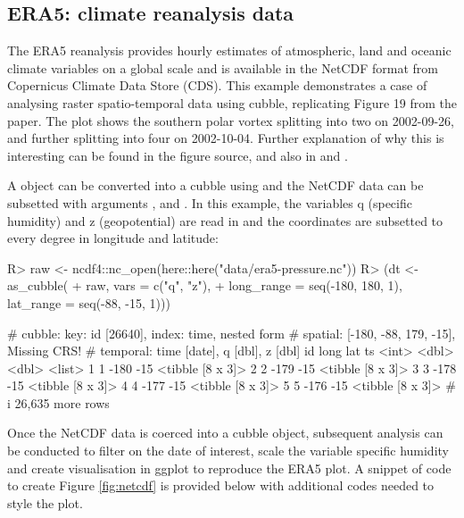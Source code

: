 \documentclass[
  shortnames]{jss}
\begin{document}
\hypertarget{era5-climate-reanalysis-data}{%
\subsection{ERA5: climate reanalysis data}\label{era5-climate-reanalysis-data}}

The ERA5 reanalysis \citep{hersbach2020era5} provides hourly estimates of atmospheric, land and oceanic climate variables on a global scale and is available in the NetCDF format from Copernicus Climate Data Store (CDS). This example demonstrates a case of analysing raster spatio-temporal data using cubble, replicating Figure 19 from the \citet{hersbach2020era5} paper. The plot shows the southern polar vortex splitting into two on 2002-09-26, and further splitting into four on 2002-10-04. Further explanation of why this is interesting can be found in the figure source, and also in \citet{simmons2020global} and \citet{simmons2005ecmwf}.

A  object \citep{ncdf4} can be converted into a cubble using  and the NetCDF data can be subsetted with arguments ,  and . In this example, the variables q (specific humidity) and z (geopotential) are read in and the coordinates are subsetted to every degree in longitude and latitude:

\begin{CodeChunk}
\begin{CodeInput}
R> raw <- ncdf4::nc_open(here::here("data/era5-pressure.nc"))
R> (dt <- as_cubble(
+   raw, vars = c("q", "z"),
+   long_range = seq(-180, 180, 1), lat_range = seq(-88, -15, 1)))
\end{CodeInput}
\begin{CodeOutput}
# cubble:   key: id [26640], index: time, nested form
# spatial:  [-180, -88, 179, -15], Missing CRS!
# temporal: time [date], q [dbl], z [dbl]
     id  long   lat ts              
  <int> <dbl> <dbl> <list>          
1     1  -180   -15 <tibble [8 x 3]>
2     2  -179   -15 <tibble [8 x 3]>
3     3  -178   -15 <tibble [8 x 3]>
4     4  -177   -15 <tibble [8 x 3]>
5     5  -176   -15 <tibble [8 x 3]>
# i 26,635 more rows
\end{CodeOutput}
\end{CodeChunk}

Once the NetCDF data is coerced into a cubble object, subsequent analysis can be conducted to filter on the date of interest, scale the variable specific humidity and create visualisation in ggplot to reproduce the ERA5 plot. A snippet of code to create Figure \ref{fig:netcdf} is provided below with additional codes needed to style the plot.
\end{document}
